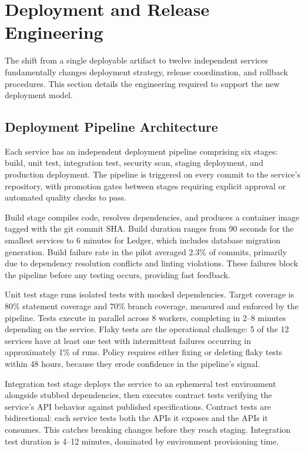 \section{Deployment and Release Engineering}

The shift from a single deployable artifact to twelve independent services fundamentally changes deployment strategy, release coordination, and rollback procedures. This section details the engineering required to support the new deployment model.

\subsection{Deployment Pipeline Architecture}

Each service has an independent deployment pipeline comprising six stages: build, unit test, integration test, security scan, staging deployment, and production deployment. The pipeline is triggered on every commit to the service's repository, with promotion gates between stages requiring explicit approval or automated quality checks to pass.

Build stage compiles code, resolves dependencies, and produces a container image tagged with the git commit SHA. Build duration ranges from 90 seconds for the smallest services to 6 minutes for Ledger, which includes database migration generation. Build failure rate in the pilot averaged 2.3\% of commits, primarily due to dependency resolution conflicts and linting violations. These failures block the pipeline before any testing occurs, providing fast feedback.

Unit test stage runs isolated tests with mocked dependencies. Target coverage is 80\% statement coverage and 70\% branch coverage, measured and enforced by the pipeline. Tests execute in parallel across 8 workers, completing in 2--8 minutes depending on the service. Flaky tests are the operational challenge: 5 of the 12 services have at least one test with intermittent failures occurring in approximately 1\% of runs. Policy requires either fixing or deleting flaky tests within 48 hours, because they erode confidence in the pipeline's signal.

Integration test stage deploys the service to an ephemeral test environment alongside stubbed dependencies, then executes contract tests verifying the service's API behavior against published specifications. Contract tests are bidirectional: each service tests both the APIs it exposes and the APIs it consumes. This catches breaking changes before they reach staging. Integration test duration is 4--12 minutes, dominated by environment provisioning time.

